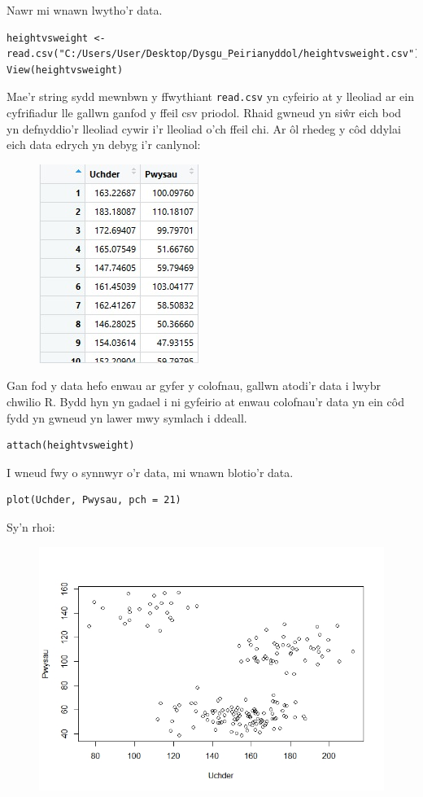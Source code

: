 Nawr mi wnawn lwytho'r data.

\begin{verbatim}
heightvsweight <- read.csv("C:/Users/User/Desktop/Dysgu_Peirianyddol/heightvsweight.csv")
View(heightvsweight)
\end{verbatim}

Mae'r string sydd mewnbwn y ffwythiant \texttt{read.csv} yn cyfeirio at y lleoliad ar ein cyfrifiadur lle gallwn ganfod y ffeil csv priodol. Rhaid gwneud yn si\^{w}r eich bod yn defnyddio'r lleoliad cywir i'r lleoliad o'ch ffeil chi.
Ar \^{o}l rhedeg y c\^{o}d ddylai eich data edrych yn debyg i'r canlynol: %

\begin{figure}[H]
\begin{center}
\includegraphics[width=0.35\linewidth]{../img/Data_yn_R.jpg}
\end{center}
\label{fig:DataR}
\end{figure}

Gan fod y data hefo enwau ar gyfer y colofnau, gallwn atodi'r data i lwybr chwilio R. Bydd hyn yn gadael i ni gyfeirio at enwau colofnau'r data yn ein c\^{o}d fydd yn gwneud yn lawer mwy symlach i ddeall.

\begin{verbatim}
attach(heightvsweight)
\end{verbatim}

I wneud fwy o synnwyr o'r data, mi wnawn blotio'r data.

\begin{verbatim}
plot(Uchder, Pwysau, pch = 21)
\end{verbatim}

Sy'n rhoi:

\begin{figure}[H]
\begin{center}
\includegraphics[width=0.5\linewidth]{../img/ScatterplotR.jpeg}
\end{center}
\label{fig:ScatterplotR}
\end{figure}

